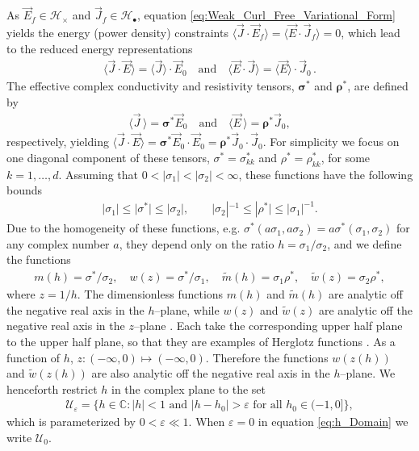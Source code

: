 \documentclass[english,12pt,jmp,graphicx]{revtex4-1}
\begin{document}
As $\vec{E}_f\in\mathscr{H}_\times$ and $\vec{J}_f\in\mathscr{H}_{\bullet}$, equation
\eqref{eq:Weak_Curl_Free_Variational_Form}
yields the energy (power density) constraints
$\langle\vec{J}\cdot\vec{E}_f\rangle=\langle\vec{E}\cdot\vec{J}_f\rangle=0$, which lead to the
reduced energy representations   
%
\begin{align}\label{eq:Reduced_System_Energy_Representations}
  \langle\vec{J}\cdot\vec{E}\rangle=\langle\vec{J}\rangle\cdot\vec{E}_0 \quad \text{and} \quad
  \langle\vec{E}\cdot\vec{J}\rangle=\langle\vec{E}\rangle\cdot\vec{J}_0\,.
\end{align}
%
The effective complex conductivity and resistivity tensors, $\bm{\sigma}^*$
and $\bm{\rho}^*$, are defined by  
%
\begin{align}\label{eq:eff_eps_def}
    \langle \vec{J} \,\rangle=  \bm{\sigma}^* \vec{E}_0 \quad \text{and} \quad
    \langle \vec{E} \,\rangle=  \bm{\rho}^*\vec{J}_0,
\end{align}
%
respectively, yielding
$\langle\vec{J}\cdot\vec{E}\rangle=\bm{\sigma}^*\vec{E}_0\cdot\vec{E}_0=\bm{\rho}^*\vec{J}_0\cdot\vec{J}_0$. For 
simplicity we focus on one diagonal component of 
these
tensors, $\sigma^*=\sigma^*_{kk}$ and $\rho^*=\rho^*_{kk}$, for some
$k=1,\ldots,d$. Assuming that $0<|\sigma_1|<|\sigma_2|<\infty$, these functions have the
following bounds \cite{Torquato:RHM-02,MILTON:2002:TC}      
%
\begin{align}\label{eq:Elementary_Bounds}
  |\sigma_1\mid\leq|\sigma^*|\leq|\sigma_2|, \qquad |\sigma_2|^{-1}\leq|\rho^*|\leq|\sigma_1|^{-1}.
\end{align}
Due to the homogeneity of these functions, e.g. 
$\sigma^*(a\sigma_1,a\sigma_2)=a\sigma^*(\sigma_1,\sigma_2)$ for any complex number $a$,
they depend only on the ratio $h=\sigma_1/\sigma_2$, and we define the
functions  
%
\begin{align}
  m(h)=\sigma^*/\sigma_2, \quad w(z)=\sigma^*/\sigma_1, \quad \tilde{m}(h)=\sigma_1\rho^*,
  \quad \tilde{w}(z)=\sigma_2\rho^*,
\end{align}
%
where $z=1/h$. The dimensionless functions $m(h)$ and
$\tilde{m}(h)$ are analytic off the negative real axis in the
$h$--plane, while $w(z)$ and $\tilde{w}(z)$ are analytic off the
negative real axis in the $z$--plane \cite{Golden:CMP-473}. Each take
the corresponding upper half plane to the upper half plane, so that
they are examples of Herglotz functions \cite{Golden:CMP-473}.
As a function of $h$, $z:(-\infty,0)\mapsto(-\infty,0)$. Therefore the
functions $w(z(h))$ and $\tilde{w}(z(h))$ are also analytic off the
negative real axis in the $h$--plane. We henceforth restrict $h$ in
the complex plane to the set   
%
\begin{align}\label{eq:h_Domain}
  \mathcal{U}_\varepsilon=\{h\in\mathbb{C}: |h|<1 \text{ and } |h-h_0|>\varepsilon
  \text{ for all } h_0\in(-1,0]\},
\end{align}
%
which is parameterized by $0<\varepsilon\ll1$. When $\varepsilon=0$ in equation
\eqref{eq:h_Domain} we write $\mathcal{U}_0$.
\end{document}

